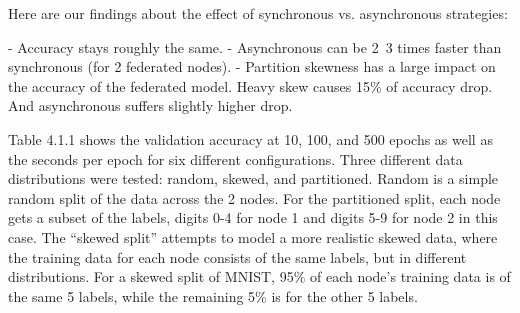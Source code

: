 \documentclass[twocolumn, switch]{article} %
\begin{document}
Here are our findings about the effect of synchronous vs. asynchronous strategies:

- Accuracy stays roughly the same.
- Asynchronous can be 2~3 times faster than synchronous (for 2 federated nodes).
- Partition skewness has a large impact on the accuracy of the federated model. Heavy skew causes 15\% of accuracy drop. And asynchronous suffers slightly higher drop.

Table 4.1.1 shows the validation accuracy at 10, 100, and 500 epochs as well as the seconds per epoch for six different configurations. Three different data distributions were tested: random, skewed, and partitioned. Random is a simple random split of the data across the 2 nodes. For the partitioned split, each node gets a subset of the labels, digits 0-4 for node 1 and digits 5-9 for node 2 in this case. The “skewed split” attempts to model a more realistic skewed data, where the training data for each node consists of the same labels, but in different distributions. For a skewed split of MNIST, 95\% of each node’s training data is of the same 5 labels, while the remaining 5\% is for the other 5 labels.




\normalsize



\end{document}
